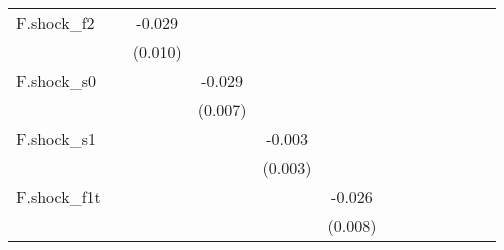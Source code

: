 {\begin{tabular}{l*{12}{c}}
\addlinespace
F.shock\_f2  &                     &      -0.029\sym{***}&                     &                     &                     &                     &                     &                     &                     &                     &                     &                     \\
            &                     &     (0.010)         &                     &                     &                     &                     &                     &                     &                     &                     &                     &                     \\
\addlinespace
F.shock\_s0  &                     &                     &      -0.029\sym{***}&                     &                     &                     &                     &                     &                     &                     &                     &                     \\
            &                     &                     &     (0.007)         &                     &                     &                     &                     &                     &                     &                     &                     &                     \\
\addlinespace
F.shock\_s1  &                     &                     &                     &      -0.003         &                     &                     &                     &                     &                     &                     &                     &                     \\
            &                     &                     &                     &     (0.003)         &                     &                     &                     &                     &                     &                     &                     &                     \\
\addlinespace
F.shock\_f1t &                     &                     &                     &                     &      -0.026\sym{***}&                     &                     &                     &                     &                     &                     &                     \\
            &                     &                     &                     &                     &     (0.008)         &                     &                     &                     &                     &                     &                     &                     \\

\end{tabular}}

